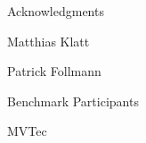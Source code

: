 
\vspace*{20mm}

\begin{center}
{ Acknowledgments}

Matthias Klatt

Patrick Follmann

Benchmark Participants

MVTec
\end{center}

\vspace{10mm}


\cleardoublepage{}
